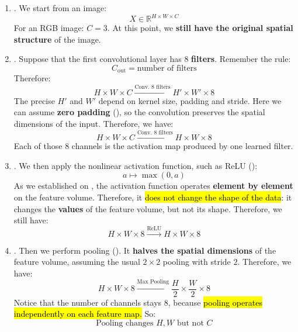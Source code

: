 \begin{enumerate}
    \item {}. We start from an image:
    \begin{equation*}
        X \in \mathbb{R}^{H \times W \times C}
    \end{equation*}
    For an RGB image: $C = 3$. At this point, we \textbf{still have the original spatial structure} of the image.


    \item {}. Suppose that the first convolutional layer has $8$ \textbf{filters}. Remember the rule:
    \begin{equation*}
        C_{\text{out}} = \text{number of filters}
    \end{equation*}
    Therefore:
    \begin{equation*}
        H \times W \times C \xrightarrow{\text{Conv. 8 filters}} H' \times W' \times 8
    \end{equation*}
    The precise $H'$ and $W'$ depend on kernel size, padding and stride. Here we can assume \textbf{zero padding} (), so the convolution preserves the spatial dimensions of the input. Therefore, we have:
    \begin{equation*}
        H \times W \times C \xrightarrow{\text{Conv. 8 filters}} H \times W \times 8
    \end{equation*}
    Each of those $8$ channels is the activation map produced by one learned filter.


    \item {}. We then apply the nonlinear activation function, such as ReLU ():
    \begin{equation*}
        a \mapsto \max(0, a)
    \end{equation*}
    As we established on , the activation function operates \textbf{element by element} on the feature volume. Therefore, it \hl{does not change the shape of the data}: it changes the \textbf{values} of the feature volume, but not its shape. Therefore, we still have:
    \begin{equation*}
        H \times W \times 8 \xrightarrow{\text{ReLU}} H \times W \times 8
    \end{equation*}


    \item {}. Then we perform pooling (). It \textbf{halves the spatial dimensions} of the feature volume, assuming the usual $2 \times 2$ pooling with stride $2$. Therefore, we have:
    \begin{equation*}
        H \times W \times 8 \xrightarrow{\text{Max Pooling}} \frac{H}{2} \times \frac{W}{2} \times 8
    \end{equation*}
    Notice that the number of channels stays 8, because \hl{pooling operates independently on each feature map.} So:
    \begin{equation*}
        \text{Pooling changes } H, W \text{ but not } C
    \end{equation*}



\end{enumerate}
